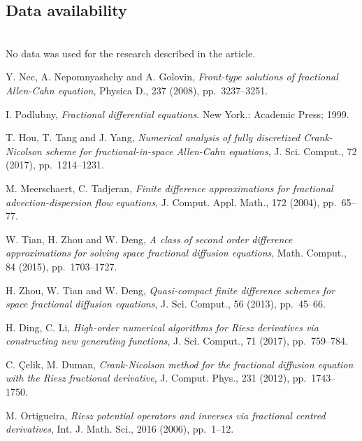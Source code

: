 \documentclass{siamart171218}
\numberwithin{theorem}{section}
\numberwithin{equation}{section}
\begin{document}
\subsection*{Data availability}\hfill \\

No data was used for the research described in the article.





%
\begin{thebibliography}{99}
{\sc Y. Nec, A. Nepomnyashchy and A. Golovin}, {\em Front-type solutions of fractional Allen-Cahn equation},
Physica D., 237 (2008), pp.~3237--3251.

{\sc I. Podlubny}, {\em Fractional differential equations}. New York.: Academic Press; 1999.

{\sc T. Hou, T. Tang and J. Yang}, {\em Numerical analysis of fully discretized
 Crank-Nicolson scheme for fractional-in-space
 Allen-Cahn equations}, J. Sci. Comput., 72 (2017), pp.~1214--1231.

{\sc M. Meerschaert, C. Tadjeran}, {\em Finite difference
approximations for fractional advection-dispersion flow
equations}, J. Comput. Appl. Math., 172 (2004), pp.~65--77.


{\sc W. Tian, H. Zhou and W. Deng}, {\em A class of second order difference approximations
 for solving space fractional diffusion equations}, Math. Comput., 84 (2015), pp.~1703--1727.

{\sc H. Zhou, W. Tian and W. Deng}, {\em Quasi-compact finite
 difference schemes for space fractional diffusion equations},
  J. Sci. Comput., 56 (2013), pp.~45--66.

{\sc H. Ding, C. Li}, {\em High-order numerical
algorithms for Riesz derivatives via constructing
new generating functions},
  J. Sci. Comput., 71 (2017), pp.~759--784.

{\sc C. \c{C}elik, M. Duman}, {\em Crank-Nicolson method for the
fractional diffusion
equation with the Riesz fractional derivative}, J. Comput. Phys., 231 (2012), pp.~1743--1750.


{\sc M. Ortigueira}, {\em Riesz potential operators and inverses
via fractional centred derivatives}, Int. J. Math. Sci.,
 2016 (2006), pp.~1--12.


\end{thebibliography}
\end{document}
